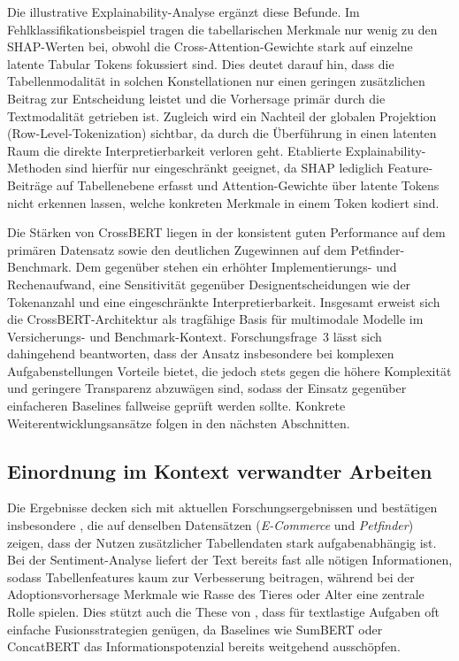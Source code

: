 Die illustrative Explainability-Analyse ergänzt diese Befunde. Im Fehlklassifikationsbeispiel tragen die tabellarischen Merkmale nur wenig zu den SHAP-Werten bei, obwohl die Cross-Attention-Gewichte stark auf einzelne latente Tabular Tokens fokussiert sind. Dies deutet darauf hin, dass die Tabellenmodalität in solchen Konstellationen nur einen geringen zusätzlichen Beitrag zur Entscheidung leistet und die Vorhersage primär durch die Textmodalität getrieben ist. Zugleich wird ein Nachteil der globalen Projektion (Row-Level-Tokenization) sichtbar, da durch die Überführung in einen latenten Raum die direkte Interpretierbarkeit verloren geht. Etablierte Explainability-Methoden sind hierfür nur eingeschränkt geeignet, da SHAP lediglich Feature-Beiträge auf Tabellenebene erfasst und Attention-Gewichte über latente Tokens nicht erkennen lassen, welche konkreten Merkmale in einem Token kodiert sind.

Die Stärken von CrossBERT liegen in der konsistent guten Performance auf dem primären Datensatz sowie den deutlichen Zugewinnen auf dem Petfinder-Benchmark. Dem gegenüber stehen ein erhöhter Implementierungs- und Rechenaufwand, eine Sensitivität gegenüber Designentscheidungen wie der Tokenanzahl und eine eingeschränkte Interpretierbarkeit. Insgesamt erweist sich die CrossBERT-Architektur als tragfähige Basis für multimodale Modelle im Versicherungs- und Benchmark-Kontext. Forschungsfrage~3 lässt sich dahingehend beantworten, dass der Ansatz insbesondere bei komplexen Aufgabenstellungen Vorteile bietet, die jedoch stets gegen die höhere Komplexität und geringere Transparenz abzuwägen sind, sodass der Einsatz gegenüber einfacheren Baselines fallweise geprüft werden sollte. Konkrete Weiterentwicklungsansätze folgen in den nächsten Abschnitten.

\newpage
\subsection{Einordnung im Kontext verwandter Arbeiten}
Die Ergebnisse decken sich mit aktuellen Forschungsergebnissen und bestätigen insbesondere \cite{Gu2021}, die auf denselben Datensätzen (\textit{E-Commerce} und \textit{Petfinder}) zeigen, dass der Nutzen zusätzlicher Tabellendaten stark aufgabenabhängig ist. Bei der Sentiment-Analyse liefert der Text bereits fast alle nötigen Informationen, sodass Tabellenfeatures kaum zur Verbesserung beitragen, während bei der Adoptionsvorhersage Merkmale wie Rasse des Tieres oder Alter eine zentrale Rolle spielen. Dies stützt auch die These von \cite{Bonnier2024}, dass für textlastige Aufgaben oft einfache Fusionsstrategien genügen, da Baselines wie SumBERT oder ConcatBERT das Informationspotenzial bereits weitgehend ausschöpfen.


